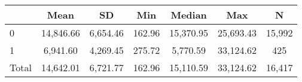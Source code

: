 {
\def\sym#1{\ifmmode^{#1}\else\(^{#1}\)\fi}
\begin{tabular}{l*{1}{cccccc}}
\hline\hline
                    &        Mean&          SD&         Min&      Median&         Max&           N\\
\hline
0                   &   14,846.66&    6,654.46&      162.96&   15,370.95&   25,693.43&      15,992\\
1                   &    6,941.60&    4,269.45&      275.72&    5,770.59&   33,124.62&         425\\
Total               &   14,642.01&    6,721.77&      162.96&   15,110.59&   33,124.62&      16,417\\
\hline\hline
\end{tabular}
}

